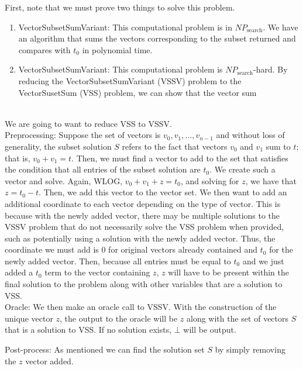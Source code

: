 \documentclass[11pt]{article}
\begin{document}
\begin{enumerate}
    First, note that we must prove two things to solve this problem.
    \begin{enumerate}
        \item VectorSubsetSumVariant: This computational problem is in $NP_{\text{search}}$. We have an algorithm that sums the vectors corresponding to the subset returned and compares with $t_0$ in polynomial time. 
        \item VectorSubsetSumVariant: This computational problem is $NP_{\text{search}}$-hard. By reducing the VectorSubsetSumVariant (VSSV) problem to the VectorSusetSum (VSS) problem, we can show that the vector sum
    \end{enumerate} \\
    
    We are going to want to reduce VSS to VSSV. \\
    
    Preprocessing: Suppose the set of vectors is $v_0, v_1, \dots, v_{n-1}$ and without loss of generality, the subset solution $S$ refers to the fact that vectors $v_0$ and $v_1$ sum to $t$; that is, $v_0 + v_1 = t$. Then, we must find a vector to add to the set that satisfies the condition that all entries of the subset solution are $t_0$. We create such a vector and solve. Again, WLOG, $v_0 + v_1 + z = t_0$, and solving for $z$, we have that $z = t_0 - t$. Then, we add this vector to the vector set. We then want to add an additional coordinate to each vector depending on the type of vector. This is because with the newly added vector, there may be multiple solutions to the VSSV problem that do not necessarily solve the VSS problem when provided, such as potentially using a solution with the newly added vector. Thus, the coordinate we must add is $0$ for original vectors already contained and $t_0$ for the newly added vector. Then, because all entries must be equal to $t_0$ and we just added a $t_0$ term to the vector containing $z$, $z$ will have to be present within the final solution to the problem along with other variables that are a solution to VSS. \\
    
    Oracle: We then make an oracle call to VSSV. With the construction of the unique vector $z$, the output to the oracle will be $z$ along with the set of vectors $S$ that is a solution to VSS. If no solution exists, $\bot$ will be output. 
    
    Post-process: As mentioned we can find the solution set $S$ by simply removing the $z$ vector added. 
    

\end{enumerate}
\end{document}
